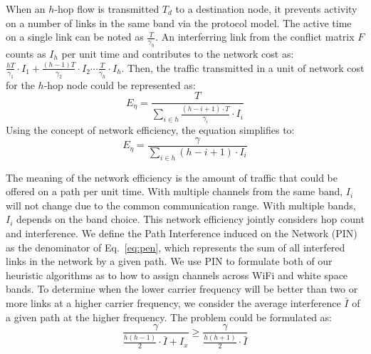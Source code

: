 When an $h$-hop flow is transmitted $T_d$ to a destination node, it prevents 
activity on a number of links in the same band via the protocol model. 
The active time on a single link can be noted as 
$\frac{T}{\gamma_h}$. 
An interferring link from the conflict matrix $F$ counts as $I_h$ per unit time
and contributes to the network cost as:
$\frac{hT}{\gamma_1}\cdot I_1 + \frac{(h-1)T}{\gamma_2}\cdot I_2 \cdots \frac{T}{\gamma_h}\cdot I_h$.
Then, the traffic transmitted in a unit of network cost for the $h$-hop node could be represented as:
\begin{equation}
\label{eq:originpen}
E_{\eta}=\frac{T}{\sum_{i \in h}\frac{(h-i+1)\cdot T}{\gamma_i}\cdot I_i }
\end{equation}
Using the concept of network efficiency, the equation simplifies to:
\begin{equation}
\label{eq:pen}
E_{\eta}=\frac{\gamma}{\sum_{i \in h} (h-i+1)\cdot I_i}
\end{equation}

The meaning of the network efficiency is the amount of traffic that could be 
offered on a path per unit time. With multiple channels from the same band,
$I_i$ will not change due to the common communication range. With multiple
bands, $I_i$ depends on the band choice.  
This network efficiency jointly considers hop count and interference. We define
the Path Interference induced on the Network (PIN) as the denominator of Eq.~\ref{eq:pen},
which represents the sum of all interfered links in the network by a given path. We
use PIN to formulate both of our heuristic algorithms as to how to assign channels
across WiFi and white space bands.
To determine when the lower carrier frequency will be better than two or more links at a
higher carrier frequency, we consider the average interference $\bar{I}$ of a given path
at the higher frequency.  The problem could be formulated as:
\begin{equation}
\label{eq:benefit}
\frac{\gamma}{\frac{h(h-1)}{2}\cdot \bar{I}+I_x} \geq \frac{\gamma}{\frac{h(h+1)}{2}\cdot \bar{I}}
\end{equation}

